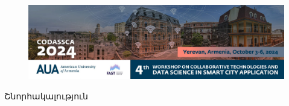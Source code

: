 \documentclass[aspectratio=169]{beamer}
\begin{document}
\begin{frame}
\begin{figure}
    \centering
    \includegraphics[scale=0.27]{AUA_Codassca2024_website-100-2048x596.jpg}
\end{figure}
    
\end{frame}

\begin{frame}
    \begin{center}
        \Huge Շնորհակալություն
    \end{center}
\end{frame}
\end{document}
